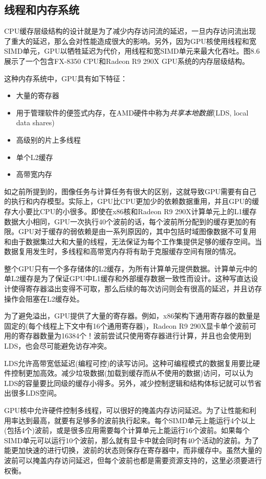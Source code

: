 \subsection{线程和内存系统}

CPU缓存层级结构的设计就是为了减少内存访问流的延迟，一旦内存访问流出现了重大的延迟，那么会对性能造成很大的影响。另外，因为GPU核使用线程和宽SIMD单元，GPU以牺牲延迟为代价，用线程和宽SIMD单元来最大化吞吐。图8.6展示了一个包含FX-8350 CPU和Radeon R9 290X GPU系统的内存层级结构。

这种内存系统中，GPU具有如下特征：

\begin{itemize}
\item 大量的寄存器
\item 用于管理软件的便签式内存，在AMD硬件中称为\emph{共享本地数据}(LDS, local data shares)
\item 高级别的片上多线程
\item 单个L2缓存
\item 高带宽内存
\end{itemize}


如之前所提到的，图像任务与计算任务有很大的区别，这就导致GPU需要有自己的执行和内存模型。实际上，GPU比CPU更加少的依赖数据重用，并且GPU的缓存大小要比CPU的小很多。即使在x86核和Radeon R9 290X计算单元上的L1缓存数据大小相同，GPU一次执行40个波前的话，每个波前所分配到的缓存更加的有限。GPU对于缓存的弱依赖是由一系列原因的，其中包括时域图像数据不可复用和由于数据集过大和大量的线程，无法保证为每个工作集提供足够的缓存空间。当数据复用发生时，多线程和高带宽内存将有助于克服缓存空间有限的情况。

整个GPU只有一个多存储体的L2缓存，为所有计算单元提供数据。计算单元中的单L2缓存是为了保证GPU中L1缓存和外部缓存数据一致性而设计。这种写直达设计使得寄存器溢出变得不可取，那么后续的每次访问则会有很高的延迟，并且访存操作会阻塞在L2缓存处。

为了避免溢出，GPU提供了大量的寄存器。例如，x86架构下通用寄存器的数量是固定的(每个线程上下文中有16个通用寄存器)，Radeon R9 290X显卡单个波前可用的寄存器数量为16384个！波前尝试只使用寄存器进行计算，并且也会使用到LDS，也会尽可能避免访存冲突。

LDS允许高带宽低延迟(编程可控)的读写访问。这种可编程模式的数据复用要比硬件控制更加高效。减少垃圾数据(加载到缓存而从不使用的数据)访问，可以认为LDS的容量要比同级的缓存小得多。另外，减少控制逻辑和结构体标记就可以节省出很多LDS空间。

GPU核中允许硬件控制多线程，可以很好的掩盖内存访问延迟。为了让性能和利用率达到最高，就要有足够多的波前执行起来。每个SIMD单元上能运行4个以上(包括4个)波前，或是很多应用需要每个计算单元上能运行16个波前。如果每个SIMD单元可以运行10个波前，那么就有显卡中就会同时有40个活动的波前。为了能更加快速的进行切换，波前的状态则保存在寄存器中，而非缓存中。虽然大量的波前可以掩盖内存访问延迟，但每个波前也都是需要资源支持的，这里必须要进行权衡。

